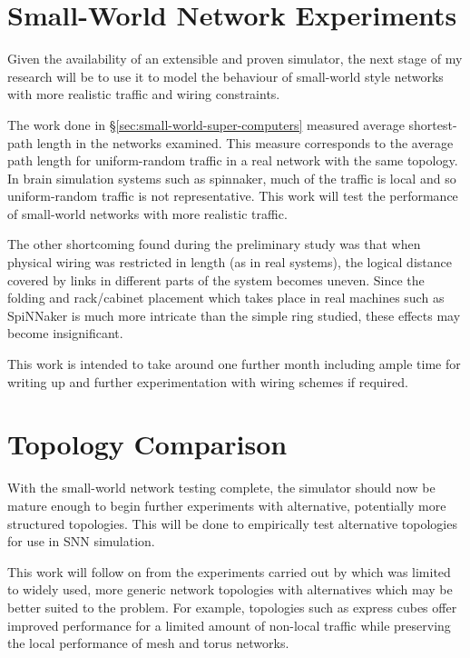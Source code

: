 	
	\section{Small-World Network Experiments}
		
		Given the availability of an extensible and proven simulator, the next stage
		of my research will be to use it to model the behaviour of small-world style
		networks with more realistic traffic and wiring constraints.
		
		The work done in \S\ref{sec:small-world-super-computers} measured average
		shortest-path length in the networks examined. This measure corresponds to
		the average path length for uniform-random traffic in a real network with
		the same topology. In brain simulation systems such as spinnaker, much of
		the traffic is local and so uniform-random traffic is not representative.
		This work will test the performance of small-world networks with more
		realistic traffic.
		
		The other shortcoming found during the preliminary study was that when
		physical wiring was restricted in length (as in real systems), the logical
		distance covered by links in different parts of the system becomes uneven.
		Since the folding and rack/cabinet placement which takes place in real
		machines such as SpiNNaker is much more intricate than the simple ring
		studied, these effects may become insignificant.
		
		This work is intended to take around one further month including ample time
		for writing up and further experimentation with wiring schemes if required.
	
	
	\section{Topology Comparison}
		
		
		With the small-world network testing complete, the simulator should now be
		mature enough to begin further experiments with alternative, potentially
		more structured topologies. This will be done to empirically test
		alternative topologies for use in SNN simulation.
		
		This work will follow on from the experiments carried out by
		\cite{vainbrand11} which was limited to widely used, more generic network
		topologies with alternatives which may be better suited to the problem. For
		example, topologies such as express cubes \cite{dally91} offer improved
		performance for a limited amount of non-local traffic while preserving the
		local performance of mesh and torus networks.
	
